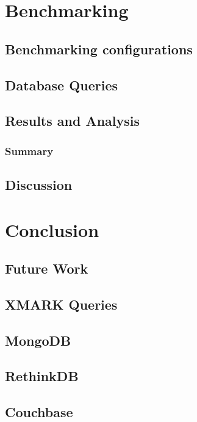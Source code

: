 \documentclass[a4paper,12pt]{book}
\begin{document}
	\chapter{Benchmarking}\label{ch:benchmarking} %
	\section{Benchmarking configurations}
	
    \section{Database Queries}
        
    \section{Results and Analysis}
        
   \subsection{Summary}
	\section{Discussion}
	\chapter{Conclusion}\label{conc} 
	    
	\section{Future Work}\label{s.future}
	    
	\begin{appendices}
	   	\chapter{XMARK Queries}\label{appendices-queries}
		\section{MongoDB}\label{mongodb-query-list}
			
		\section{RethinkDB}\label{rethinkdb-query-list}
				
		\section{Couchbase}\label{couchbase-query-list}
				
								
	\end{appendices}
\end{document}
